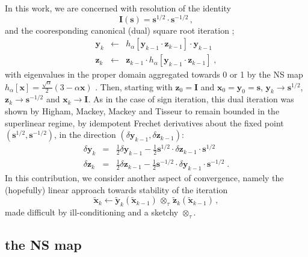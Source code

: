\documentclass[letterpaper,twocolumn,amsmath,amsfont,amssymb,english,aps,jcp,preprintnumbers,groupaddress,nofootinbib,tightenlines]{revtex4}
\newcommand{\mat}[1]{\boldsymbol{#1}}
\newcommand{\ot}{ {\scriptstyle \otimes}_{ \tau } }
\begin{document}
In this work, we are concerned with resolution of the identity \cite{}
\begin{equation}
\mat{I} \left( \mat{s} \right) =\mat{s}^{1/2} \cdot \mat{s}^{-1/2} \, ,
\end{equation}
and the cooresponding canonical (dual) square root iteration \cite{};
\begin{eqnarray}\label{cannonical}
\mat{y}_k &\leftarrow& h_\alpha \left[ \mat{y}_{k-1} \cdot \mat{z}_{k-1} \right] \cdot \mat{y}_{k-1}  \nonumber \\
\mat{z}_k &\leftarrow& \mat{z}_{k-1} \cdot h_\alpha \left[ \mat{y}_{k-1} \cdot \mat{z}_{k-1} \right] \; ,
\end{eqnarray}
with eigenvalues in the proper domain aggregated towards 0 or 1 by the
NS map $h_\alpha[\mat{x}]=\frac{\sqrt{\alpha}}{2} \left(3-\alpha
\mat{x} \right)$ \cite{}.  Then, starting with $\mat{z}_0=\mat{I}$ and
$\mat{x}_0=\mat{y}_0=\mat{s}$, ${\mat{y}}_k \rightarrow
\mat{s}^{1/2}$, ${\mat{z}}_k \rightarrow \mat{s}^{-1/2}$ and
${\mat{x}}_k \rightarrow {\mat{I}}$.  As in the case of sign
iteration, this dual iteration was shown by Higham, Mackey, Mackey and
Tisseur \cite{Higham2005} to remain bounded in the superlinear regime,
by idempotent Frechet derivatives about the fixed point
$\left(\mat{s}^{1/2},\mat{s}^{-1/2}\right)$, in the direction $\left(
\delta \mat{y}_{k-1} , \delta \mat{z}_{k-1} \right)$:
\begin{eqnarray}
\delta \mat{y}_k &=& \frac{1}{2} \delta \mat{y}_{k-1} - \frac{1}{2} \mat{s}^{1/2} \cdot \delta \mat{z}_{k-1} \cdot \mat{s}^{1/2} \\
\delta \mat{z}_k &=& \frac{1}{2} \delta \mat{z}_{k-1} - \frac{1}{2} \mat{s}^{-1/2} \cdot \delta \mat{y}_{k-1} \cdot \mat{s}^{-1/2} \;.
\end{eqnarray}
In this contribution, we consider another aspect of convergence,
namely the (hopefully) linear approach towards stability of the
iteration
\begin{equation}
\widetilde{\mat{x}}_k \leftarrow
 \widetilde{\mat{y}}_k \left( \widetilde{\mat{x}}_{k-1} \right)
\, \ot \, \widetilde{\mat{z}}_k \left( \widetilde{\mat{x}}_{k-1} \right) \, ,
\end{equation}
made difficult by ill-conditioning and a sketchy $\ot$.

\subsection{the NS map}
\end{document}

